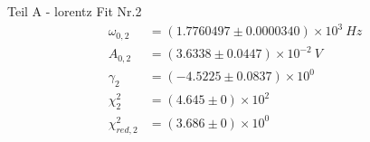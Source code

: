 {\LARGE Teil A - lorentz Fit Nr.2}
\begin{align*}
	\omega_{0,2} &= \left(1.7760497 \pm 0.0000340\right) \times 10^{3}\ Hz\\
	A_{0,2} &= \left(3.6338 \pm 0.0447\right) \times 10^{-2}\ V\\
	\gamma_2 &= \left(-4.5225 \pm 0.0837\right) \times 10^{0}\ \\
	\chi^2_{2} &= \left(4.645 \pm 0\right) \times 10^{2}\ \\
	\chi^2_{red,2} &= \left(3.686 \pm 0\right) \times 10^{0}\ \\
\end{align*}